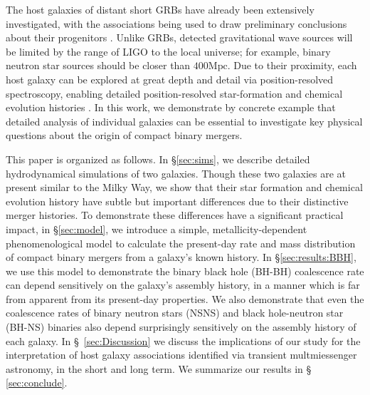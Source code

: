 \documentclass[nofootinbib,twocolumn,prd]{emulateapj}
\newcommand\editremark[1]{{\color{red}#1}}
\newcommand\unit[1]{\text{#1}}
\begin{document}
The host galaxies of distant short GRBs have already been extensively investigated, with the associations being used to
draw preliminary conclusions about their progenitors  \citep{2014ARAA..52...43B}.   
Unlike GRBs, detected gravitational wave sources will be limited by the range of LIGO to the local universe; for
example,  binary neutron star sources should be closer than $400\unit{Mpc}$.  Due to their proximity, each host galaxy
can be explored at great depth and detail via  position-resolved spectroscopy, enabling detailed position-resolved star-formation
and chemical evolution histories  \citep[see,e.g.][]{2009MNRAS.396..462K,2014MNRAS.444..336C,
  Dalcanton09,Williams11,CALIFA}.  
In this work, we demonstrate by concrete example that detailed analysis of individual galaxies can be essential to
investigate key physical questions about the origin of compact binary mergers. 



This paper is organized as follows. 
In \S \ref{sec:sims}, we describe detailed hydrodynamical simulations of  two galaxies.  Though these two
galaxies are at  present similar to the Milky Way, we
show that their star formation and chemical evolution history have subtle but important differences due to their
distinctive merger histories.   To demonstrate
these differences have a significant practical impact,  in \S \ref{sec:model}, we introduce a simple,
metallicity-dependent  phenomenological model to calculate the present-day rate and mass distribution of compact binary
mergers from  a galaxy's known history.   In \S \ref{sec:results:BBH}, we use this model to demonstrate the binary black
hole (BH-BH) coalescence rate
can depend sensitively on the galaxy's assembly history, in a manner which is far from apparent from its present-day
properties.    We also demonstrate that even the coalescence rates of binary neutron stars (NSNS) and black hole-neutron
star (BH-NS) binaries also depend surprisingly sensitively on the assembly history of each galaxy. 
In \S~\ref{sec:Discussion} we discuss the implications of our study for the interpretation of host galaxy associations
identified via transient multmiessenger astronomy, in the short and long term.  We summarize our results in \S~ \ref{sec:conclude}.
%
\end{document}

